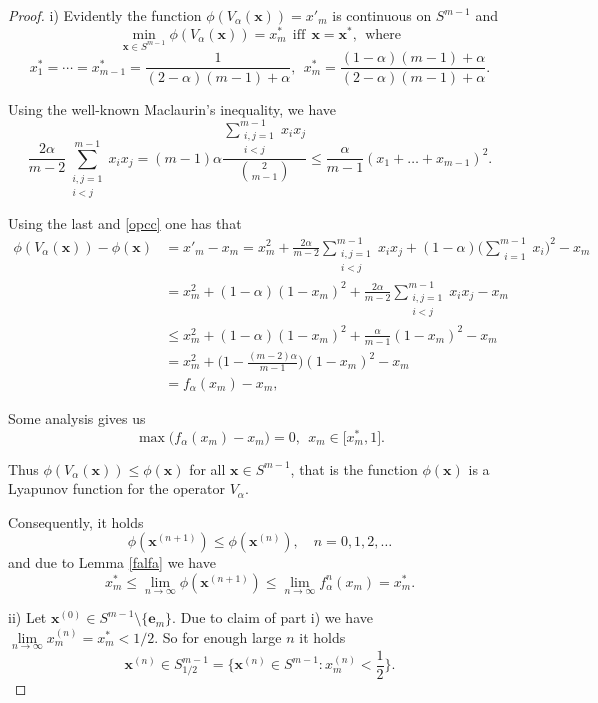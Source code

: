 \documentclass[10pt,a4paper]{amsart}
\begin{document}
\begin{proof}  i) Evidently the function $\phi(V_\alpha(\mathbf{x}))=x'_m$ is continuous on $S^{m-1}$ and
\[\min\limits_{\mathbf{x}\in S^{m-1}} \phi(V_\alpha(\mathbf{x})) =x_m^* \ \ \text{iff} \ \  \mathbf{x}=\mathbf{x}^*, \ \ \text{where}\]
\[x_1^*=\cdots=x_{m-1}^* =\frac{1}{ (2-\alpha)(m-1)+\alpha}, \ \ x_m^*=\frac{(1-\alpha)(m-1)+\alpha}{ (2-\alpha)(m-1)+\alpha}.\]

Using the well-known Maclaurin's inequality, we have
\[\frac{2\alpha}{m-2} \displaystyle\sum_{\substack{i,j=1\\ i<j}}^{m-1} x_ix_j =
(m-1)\alpha \frac{\displaystyle\sum_{\substack{i,j=1\\ i<j}}^{m-1} x_ix_j}{
\binom{2}{m-1}} \leq \frac{\alpha}{ m-1} (x_1+\dots+x_{m-1})^2.\]

Using the last and \eqref{opcc} one has that
\begin{align*}
\phi(V_\alpha(\mathbf{x}))-\phi(\mathbf{x})&=x'_m-x_m= x_m^2+
               \frac{2\alpha}{m-2}\displaystyle\sum_{\substack{i,j=1\\ i<j}}^{m-1} x_ix_j +
               (1-\alpha) \Big(\displaystyle\sum_{\substack{i=1}}^{m-1} x_i\Big)^2-x_m\\
&= x_m^2+(1-\alpha) (1-x_m)^2 +  \frac{2\alpha}{m-2}\displaystyle\sum_{\substack{i,j=1\\ i<j}}^{m-1} x_ix_j-x_m\\
&\leq x_m^2+(1-\alpha) (1-x_m)^2 +  \frac{\alpha}{m-1}(1-x_m)^2-x_m\\
&=x_m^2+\Big(1-\frac{(m-2)\alpha}{m-1}\Big) (1-x_m)^2-x_m\\
&= f_\alpha(x_m)-x_m,
\end{align*}

Some analysis gives us
\[\max  \Big(f_\alpha(x_m)-x_m\Big) =0, \ \ x_m\in \Big[x^*_m,1\Big]. \]


Thus $\phi(V_\alpha(\mathbf{x}))\leq \phi(\mathbf{x}) $ for all $\mathbf{x}\in S^{m-1}$, that is
the function $\phi(\mathbf{x})$ is a Lyapunov function for the operator $V_\alpha$.

Consequently, it  holds
\[\phi(\mathbf{x}^{(n+1)}) \leq \phi(\mathbf{x}^{(n)}), \quad n=0,1,2,\dots   \]
and  due to Lemma \ref{falfa}  we have
\begin{equation}\label{mcorr}
x_m^* \leq \lim\limits_{n\rightarrow\infty} \phi(\mathbf{x}^{(n+1)})
\leq \lim\limits_{n\rightarrow\infty} f^n_\alpha(x_m)=x_m^*.
\end{equation}


ii) Let $\mathbf{x}^{(0)}\in S^{m-1}\setminus \{\mathbf{e}_m\}$. Due to claim of  part i) we have $ \lim\limits_{n\rightarrow\infty} x_m^{(n)}=x_m^*<1/2$. So for enough large $n$ it  holds
\[\mathbf{x}^{(n)}\in S^{m-1}_{1/2}=\{\mathbf{x}^{(n)}\in S^{m-1}: x_m^{(n)}<\frac{1}{2}\}. \]




\end{proof}
\end{document}
